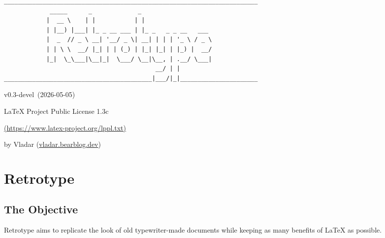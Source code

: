 \documentclass[english,12pt,openany,letterpaper]{book}
\def\author{Vladar}
\def\license{LaTeX Project Public License 1.3c}
\def\licenselink{https://www.latex-project.org/lppl.txt}
\def\rtVer{0.3-devel}
\def\rtDate{2026-05-05}
\begin{document}

\begin{titlepage}

\begin{verbatim}
________________________________________________________________________
             _____      _             _                                 
            |  __ \    | |           | |                                
            | |__) |___| |_ _ __ ___ | |_ _   _ _ __   ___              
            |  _  // _ \ __| '__/ _ \| __| | | | '_ \ / _ \             
            | | \ \  __/ |_| | | (_) | |_| |_| | |_) |  __/             
            |_|  \_\___|\__|_|  \___/ \__|\__, | .__/ \___|             
                                           __/ | |
__________________________________________|___/|_|______________________
\end{verbatim}

{\hfill v\rtVer~(\rtDate)}

\vfill

\begin{adjustbox}{center}
\end{adjustbox}

\vfill
\vfill

{\hfill\license\hfill}

{\hfill\href{\licenselink}{(\licenselink)}\hfill}

{\hfill{}by \author{} (\href{https://vladar.bearblog.dev}{vladar.bearblog.dev})\hfill}

\end{titlepage}


\toc[3]

\chapter{Retrotype}

\clearBg
\clearFg

\rightbox[\baselineskip]{{\bfseries\itshape \rtDate}}

\section{The Objective}

Retrotype aims to replicate the look of old typewriter-made documents while keeping as many benefits of LaTeX as possible.
\end{document}
